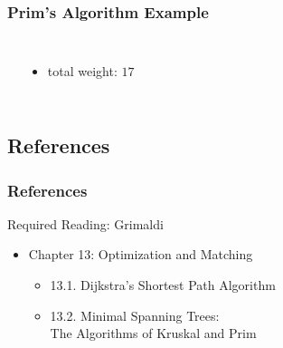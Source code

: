 \documentclass[dvipsnames]{beamer}
\begin{document}
\begin{frame}
  \frametitle{Prim's Algorithm Example}

  \begin{example}[$7 \nless 7$]
    \begin{columns}
      \begin{center}
      \end{center}

      \begin{itemize}
        \item total weight: $17$
      \end{itemize}
    \end{columns}
  \end{example}
\end{frame}

\subsection*{References}

\begin{frame}
  \frametitle{References}

  \begin{block}{Required Reading: Grimaldi}
    \begin{itemize}
      \item Chapter 13: Optimization and Matching
      \begin{itemize}
        \item 13.1. \alert{Dijkstra's Shortest Path Algorithm}
        \item 13.2. \alert{Minimal Spanning Trees:\\
			   The Algorithms of Kruskal and Prim}
      \end{itemize}
    \end{itemize}
  \end{block}
\end{frame}
\end{document}
